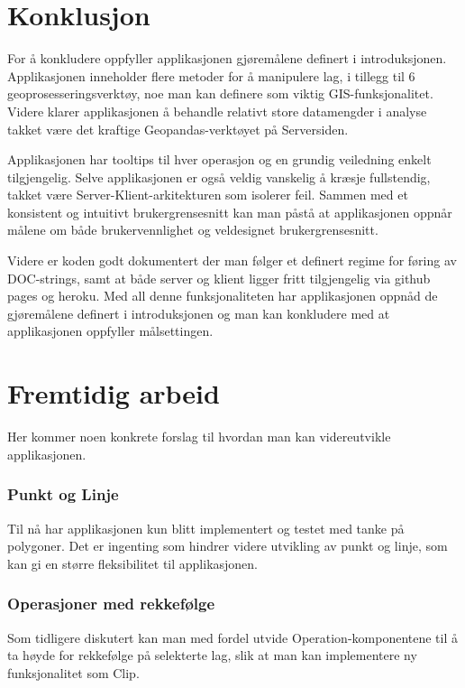 \section{Konklusjon}

For å konkludere oppfyller applikasjonen gjøremålene definert i introduksjonen. Applikasjonen inneholder flere metoder for å manipulere lag, i tillegg til 6 geoprosesseringsverktøy, noe man kan definere som viktig GIS-funksjonalitet. Videre klarer applikasjonen å behandle relativt store datamengder i analyse takket være det kraftige Geopandas-verktøyet på Serversiden. 

Applikasjonen har tooltips til hver operasjon og en grundig veiledning enkelt tilgjengelig. Selve applikasjonen er også veldig vanskelig å kræsje fullstendig, takket være Server-Klient-arkitekturen som isolerer feil. Sammen med et konsistent og intuitivt brukergrensesnitt kan man påstå at applikasjonen oppnår målene om både brukervennlighet og veldesignet brukergrensesnitt. 

Videre er koden godt dokumentert der man følger et definert regime for føring av DOC-strings, samt at både server og klient ligger fritt tilgjengelig via github pages og heroku. Med all denne funksjonaliteten har applikasjonen oppnåd de gjøremålene definert i introduksjonen og man kan konkludere med at applikasjonen oppfyller målsettingen. 

\section{Fremtidig arbeid}

Her kommer noen konkrete forslag til hvordan man kan videreutvikle applikasjonen. 

\subsubsection{Punkt og Linje}

Til nå har applikasjonen kun blitt implementert og testet med tanke på polygoner. Det er ingenting som hindrer videre utvikling av punkt og linje, som kan gi en større fleksibilitet til applikasjonen. 

\subsubsection{Operasjoner med rekkefølge}

Som tidligere diskutert kan man med fordel utvide Operation-komponentene til å ta høyde for rekkefølge på selekterte lag, slik at man kan implementere ny funksjonalitet som Clip. 

